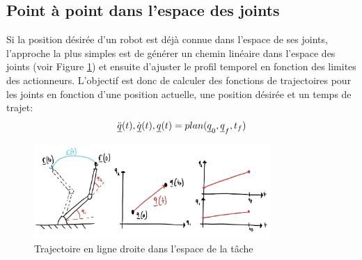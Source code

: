 


\subsection{Point à point dans l'espace des joints}

Si la position désirée d'un robot est déjà connue dans l'espace de ses joints, l'approche la plus simples est de générer un chemin linéaire dans l'espace des joints (voir Figure \ref{fig:traj_joint_line}) et ensuite d'ajuster le profil temporel en fonction des limites des actionneurs. L'objectif est donc de calculer des fonctions de trajectoires pour les joints en fonction d'une position actuelle, une position désirée et un temps de trajet:
\begin{align}
  \ddot{\underline{q}}(t),\dot{\underline{q}}(t),\underline{q}(t) = plan(\underline{q}_{0}, \underline{q}_f, t_f)
	\label{eq:trajgen}
\end{align}
\begin{figure}[ht]
	\centering
		\includegraphics[width=0.80\textwidth]{fig/traj_joint_line.jpeg}
	\caption{Trajectoire en ligne droite dans l'espace de la tâche}
	\label{fig:traj_joint_line}
\end{figure}

